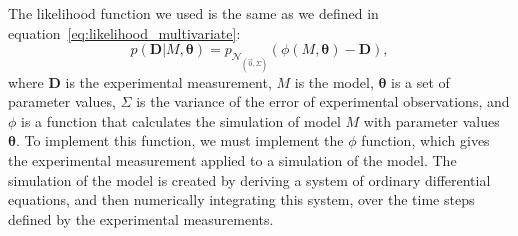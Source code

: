The likelihood function we used is the same as we defined in
equation~\ref{eq:likelihood_multivariate}:
\begin{equation*}
    p ({\bm D} | M,{\bm \theta}) = 
        p_{\mathcal{N}_{\left(\vec{0}, \Sigma\right)}}
        (\phi (M, {\bm\theta}) - {\bm D}),
\end{equation*}
where ${\bm D}$ is the experimental measurement, $M$ is the model,
${\bm \theta}$ is a set of parameter values, $\Sigma$ is the variance of
the error of experimental observations, and $\phi$ is a function that
calculates the simulation of model $M$ with parameter values ${\bm
\theta}$.  To implement this function, we must implement the $\phi$
function, which gives the experimental measurement applied to a 
simulation of the model. The simulation of the model is created by 
deriving a system of ordinary differential equations, and then
numerically integrating this system, over the time steps defined by the 
experimental measurements. 


